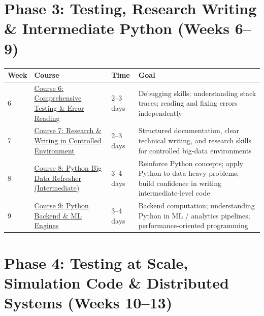 \documentclass[12pt]{article}
\begin{document}
	\vspace{0.3cm}
	
	\section*{Phase 3: Testing, Research Writing \& Intermediate Python (Weeks 6–9)}
	
	\begin{tabularx}{\textwidth}{|X|p{3cm}|p{3cm}|X|}
		\hline
		\textbf{Week} & \textbf{Course} & \textbf{Time} & \textbf{Goal} \\
		\hline
		6 & \href{https://www.udemy.com/course/full-spectrum-comprehensive-testing-error-reading-101/}{Course 6: Comprehensive Testing \& Error Reading} & 2–3 days & Debugging skills; understanding stack traces; reading and fixing errors independently \\
		\hline
		7 & \href{https://www.udemy.com/course/research-writing-skills-for-essays-in-controlled-environment}{Course 7: Research \& Writing in Controlled Environment} & 2–3 days & Structured documentation, clear technical writing, and research skills for controlled big-data environments \\
		\hline
		8 & \href{https://www.udemy.com/course/refresher-python-big-data-intermediate-quiz-based-course-102/}{Course 8: Python Big Data Refresher (Intermediate)} & 3–4 days & Reinforce Python concepts; apply Python to data‑heavy problems; build confidence in writing intermediate‑level code \\
		\hline
		9 & \href{https://www.udemy.com/course/python-full-stack-and-backend-engines-for-mc-ml-engines-102/}{Course 9: Python Backend \& ML Engines} & 3–4 days & Backend computation; understanding Python in ML / analytics pipelines; performance‑oriented programming \\
		\hline
	\end{tabularx}
	
	\vspace{0.3cm}
	
	\section*{Phase 4: Testing at Scale, Simulation Code \& Distributed Systems (Weeks 10–13)}
	
\end{document}
